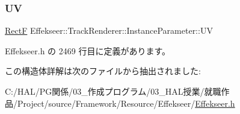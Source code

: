 \subsubsection{\texorpdfstring{UV}{UV}}
{\footnotesize\ttfamily \mbox{\hyperlink{struct_effekseer_1_1_rect_f}{RectF}} Effekseer\+::\+Track\+Renderer\+::\+Instance\+Parameter\+::\+UV}



 Effekseer.\+h の 2469 行目に定義があります。



この構造体詳解は次のファイルから抽出されました\+:\begin{DoxyCompactItemize}
\item 
C\+:/\+H\+A\+L/\+P\+G関係/03\+\_\+作成プログラム/03\+\_\+\+H\+A\+L授業/就職作品/\+Project/source/\+Framework/\+Resource/\+Effekseer/\mbox{\hyperlink{_effekseer_8h}{Effekseer.\+h}}\end{DoxyCompactItemize}
